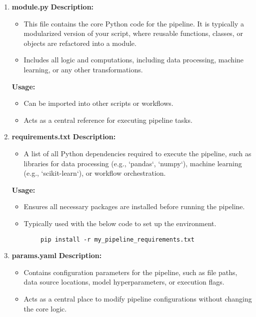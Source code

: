  \begin{enumerate}
 	\item \textbf{module.py} \linebreak
 	\textbf{Description: }
 	\begin{itemize}
 		\item This file contains the core Python code for the pipeline. It is typically a modularized version of your script, where reusable functions, classes, or objects are refactored into a module.
 	    \item Includes all logic and computations, including data processing, machine learning, or any other transformations.
 		\end{itemize}
 		
 	\textbf{Usage:} 
 	\begin{itemize}
 		\item Can be imported into other scripts or workflows.
 	    \item Acts as a central reference for executing pipeline tasks.
 \end{itemize}
 
 	\item \textbf{requirements.txt} \linebreak
 	\textbf{Description:} 
 	\begin{itemize}
 		\item A list of all Python dependencies required to execute the pipeline, such as libraries for data processing (e.g., `pandas`, `numpy`), machine learning (e.g., `scikit-learn`), or workflow orchestration.
 \end{itemize}
 	\textbf{Usage:}
 	\begin{itemize}
 		\item Ensures all necessary packages are installed before running the pipeline.
 	   \item Typically used with the below code to set up the environment.
 		\end{itemize}
 		
 	\begin{lstlisting}
 		pip install -r my_pipeline_requirements.txt
 	\end{lstlisting} 
 	
 	\item \textbf{params.yaml} \linebreak
 \textbf{	Description: }
 \begin{itemize} 
 	  \item Contains configuration parameters for the pipeline, such as file paths, data source locations, model hyperparameters, or execution flags.
 	\item Acts as a central place to modify pipeline configurations without changing the core logic.
 	

\end{itemize}
\end{enumerate}
